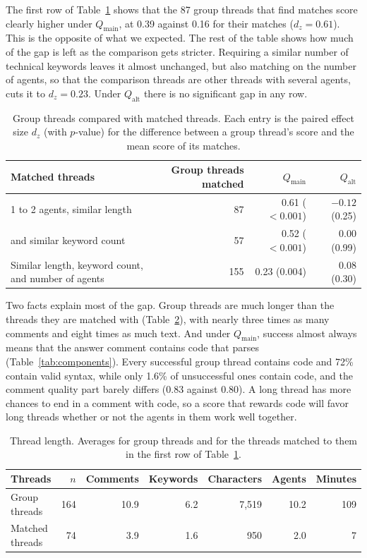 \documentclass[11pt]{article}
\newcommand{\qmain}{Q_{\text{main}}}
\newcommand{\qalt}{Q_{\text{alt}}}
\begin{document}
The first row of Table~\ref{tab:collab} shows that the 87 group threads that find matches score clearly higher under $\qmain$, at 0.39 against 0.16 for their matches ($d_z = 0.61$). This is the opposite of what we expected. The rest of the table shows how much of the gap is left as the comparison gets stricter. Requiring a similar number of technical keywords leaves it almost unchanged, but also matching on the number of agents, so that the comparison threads are other threads with several agents, cuts it to $d_z = 0.23$. Under $\qalt$ there is no significant gap in any row.

\begin{table}[H]
\centering
\caption{Group threads compared with matched threads. Each entry is the paired effect size $d_z$ (with $p$-value) for the difference between a group thread's score and the mean score of its matches.}
\label{tab:collab}
\small
\begin{tabular}{@{}lrrr@{}}
\toprule
\textbf{Matched threads} & \textbf{Group threads matched} & \textbf{$\qmain$} & \textbf{$\qalt$} \\
\midrule
1 to 2 agents, similar length & 87 & 0.61 ($<0.001$) & $-0.12$ (0.25) \\
\quad and similar keyword count & 57 & 0.52 ($<0.001$) & 0.00 (0.99) \\
Similar length, keyword count, and number of agents & 155 & 0.23 (0.004) & 0.08 (0.30) \\
\bottomrule
\end{tabular}
\end{table}

Two facts explain most of the gap. Group threads are much longer than the threads they are matched with (Table~\ref{tab:threads}), with nearly three times as many comments and eight times as much text. And under $\qmain$, success almost always means that the answer comment contains code that parses (Table~\ref{tab:components}). Every successful group thread contains code and 72\% contain valid syntax, while only 1.6\% of unsuccessful ones contain code, and the comment quality part barely differs (0.83 against 0.80). A long thread has more chances to end in a comment with code, so a score that rewards code will favor long threads whether or not the agents in them work well together.

\begin{table}[H]
\centering
\caption{Thread length. Averages for group threads and for the threads matched to them in the first row of Table~\ref{tab:collab}.}
\label{tab:threads}
\small
\begin{tabular}{@{}lrrrrrr@{}}
\toprule
\textbf{Threads} & \textbf{$n$} & \textbf{Comments} & \textbf{Keywords} & \textbf{Characters} & \textbf{Agents} & \textbf{Minutes} \\
\midrule
Group threads & 164 & 10.9 & 6.2 & 7,519 & 10.2 & 109 \\
Matched threads & 74 & 3.9 & 1.6 & 950 & 2.0 & 7 \\
\bottomrule
\end{tabular}
\end{table}
\end{document}
